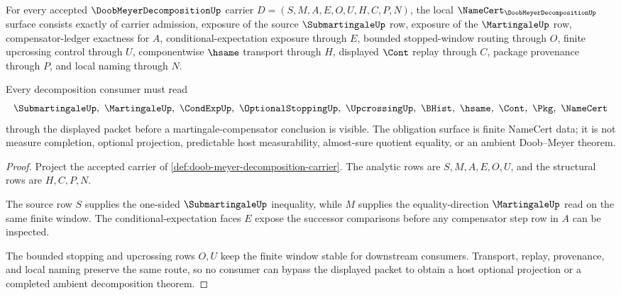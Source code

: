 \begin{theorem}
\label{thm:doob-meyer-decomposition-namecert-obligations}
For every accepted $\DoobMeyerDecompositionUp$ carrier $D=(S,M,A,E,O,U,H,C,P,N)$, the local $\NameCert_{\DoobMeyerDecompositionUp}$ surface consists exactly of carrier admission, exposure of the source $\SubmartingaleUp$ row, exposure of the $\MartingaleUp$ row, compensator-ledger exactness for $A$, conditional-expectation exposure through $E$, bounded stopped-window routing through $O$, finite upcrossing control through $U$, componentwise $\hsame$ transport through $H$, displayed $\Cont$ replay through $C$, package provenance through $P$, and local naming through $N$.

Every decomposition consumer must read
$$
\SubmartingaleUp,\ \MartingaleUp,\ \CondExpUp,\ \OptionalStoppingUp,\ \UpcrossingUp,\ \BHist,\ \hsame,\ \Cont,\ \Pkg,\ \NameCert
$$
through the displayed packet before a martingale-compensator conclusion is visible. The obligation surface is finite NameCert data; it is not measure completion, optional projection, predictable host measurability, almost-sure quotient equality, or an ambient Doob--Meyer theorem.
\end{theorem}
\begin{proof}
Project the accepted carrier of \autoref{def:doob-meyer-decomposition-carrier}. The analytic rows are $S,M,A,E,O,U$, and the structural rows are $H,C,P,N$.

The source row $S$ supplies the one-sided $\SubmartingaleUp$ inequality, while $M$ supplies the equality-direction $\MartingaleUp$ read on the same finite window. The conditional-expectation faces $E$ expose the successor comparisons before any compensator step row in $A$ can be inspected.

The bounded stopping and upcrossing rows $O,U$ keep the finite window stable for downstream consumers. Transport, replay, provenance, and local naming preserve the same route, so no consumer can bypass the displayed packet to obtain a host optional projection or a completed ambient decomposition theorem.
\end{proof}

